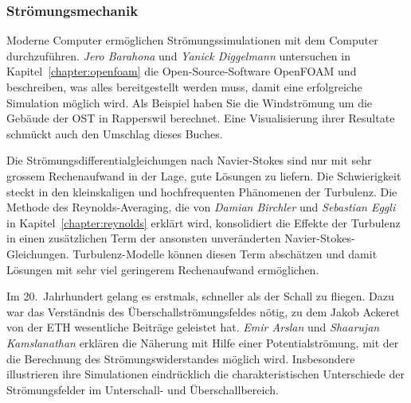 %
%
\subsubsection{Strömungsmechanik}

%
%
Moderne Computer ermöglichen Strömungssimulationen mit dem Computer
%
durchzuführen.
\emph{Jero Barahona}
%
und
\emph{Yanick Diggelmann}
%
%
untersuchen in Kapitel~\ref{chapter:openfoam} die Open-Source-Software
OpenFOAM und beschreiben, was alles bereitgestellt werden muss, damit
%
eine erfolgreiche Simulation möglich wird.
Als Beispiel haben Sie die Windströmung um die Gebäude der OST in
%
%
Rapperswil berechnet.
%
Eine Visualisierung ihrer Resultate schmückt auch den Umschlag dieses
Buches.

%
%
Die Strömungsdifferentialgleichungen nach Navier-Stokes sind nur
%
mit sehr grossem Rechenaufwand in der Lage, gute Lösungen zu liefern.
Die Schwierigkeit steckt in den kleinskaligen und hochfrequenten 
Phänomenen der Turbulenz.
Die Methode des Reynolds-Averaging, die von
\emph{Damian Birchler}
%
%
und
\emph{Sebastian Eggli}
%
%
in Kapitel~\ref{chapter:reynolds} erklärt wird, konsolidiert die Effekte
der Turbulenz in einen zusätzlichen Term der ansonsten unveränderten
Navier-Stokes-Gleichungen.
Turbulenz-Modelle können diesen Term abschätzen und damit Lösungen mit
%
sehr viel geringerem Rechenaufwand ermöglichen.

%
%
Im 20.~Jahrhundert gelang es erstmals, schneller als der Schall zu
fliegen.
Dazu war das Verständnis des Überschallströmungsfeldes nötig, zu dem
%
Jakob Ackeret von der ETH wesentliche Beiträge geleistet hat.
%
\emph{Emir Arslan}
%
%
und
\emph{Shaarujan Kamslanathan}
%
%
erklären die Näherung mit Hilfe einer Potentialströmung, mit der
die Berechnung des Strömungswiderstandes möglich wird.
Insbesondere illustrieren ihre Simulationen eindrücklich die
charakteristischen Unterschiede der Strömungsfelder im Unterschall-
und Überschallbereich.

